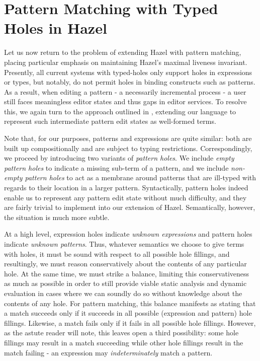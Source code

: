 \section{Pattern Matching with Typed Holes in Hazel}\label{sec:pattern-matching}

Let us now return to the problem of extending Hazel with pattern matching, placing particular emphasis on maintaining Hazel's maximal liveness invariant. Presently, all current systems with typed-holes only support holes in expressions or types, but notably, do not permit holes in binding constructs such as patterns. As a result, when editing a pattern - a necessarily incremental process - a user still faces meaningless editor states and thus gaps in editor services. To resolve this, we again turn to the approach outlined in \cite{DBLP:conf/snapl/OmarVHSGAH17}, extending our language to represent such intermediate pattern edit states as well-formed terms. 

Note that, for our purposes, patterns and expressions are quite similar: both are built up compositionally and are subject to typing restrictions. Correspondingly, we proceed by introducing two variants of \emph{pattern holes}. We include \emph{empty pattern holes} to indicate a missing sub-term of a pattern, and we include \emph{non-empty pattern holes} to act as a membrane around patterns that are ill-typed with regards to their location in a larger pattern. Syntactically, pattern holes indeed enable us to represent any pattern edit state without much difficulty, and they are fairly trivial to implement into our extension of Hazel. Semantically, however, the situation is much more subtle. 

At a high level, expression holes indicate \emph{unknown expressions} and pattern holes indicate \emph{unknown patterns}. Thus, whatever semantics we choose to give terms with holes, it must be sound with respect to all possible hole fillings, and resultingly, we must reason conservatively about the contents of any particular hole. At the same time, we must strike a balance, limiting this conservativeness as much as possible in order to still provide viable static analysis and dynamic evaluation in cases where we can soundly do so without knowledge about the contents of any hole. For pattern matching, this balance manifests as stating that a match succeeds only if it succeeds in all possible (expression and pattern) hole fillings. Likewise, a match fails only if it fails in all possible hole fillings. However, as the astute reader will note, this leaves open a third possibility: some hole fillings may result in a match succeeding while other hole fillings result in the match failing - an expression may \emph{indeterminately} match a pattern. 


